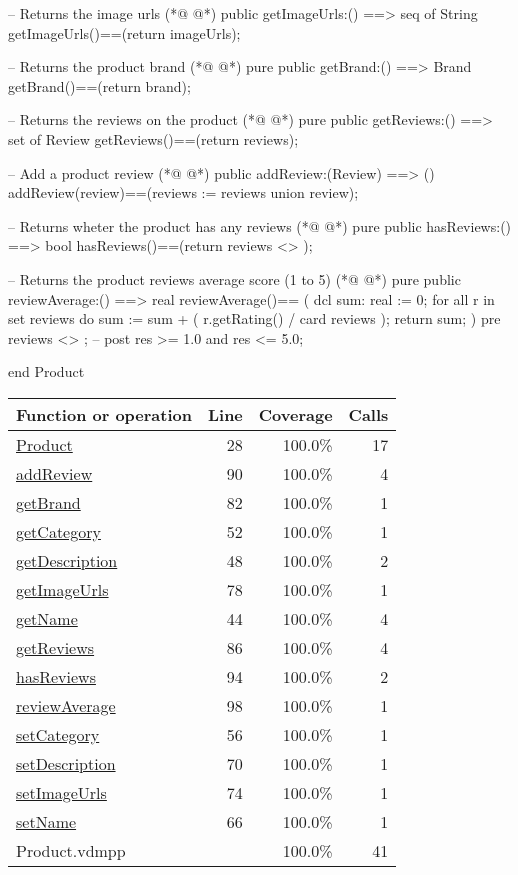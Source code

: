\begin{vdmpp}[breaklines=true]
  -- Returns the image urls
(*@
\label{getImageUrls:78}
@*)
  public getImageUrls:() ==> seq of String
  getImageUrls()==(return imageUrls);
  
  -- Returns the product brand
(*@
\label{getBrand:82}
@*)
  pure public getBrand:() ==> Brand
  getBrand()==(return brand);
  
  -- Returns the reviews on the product
(*@
\label{getReviews:86}
@*)
  pure public getReviews:() ==> set of Review
  getReviews()==(return reviews);
  
  -- Add a product review
(*@
\label{addReview:90}
@*)
  public addReview:(Review) ==> ()
  addReview(review)==(reviews := reviews union {review});
  
  -- Returns wheter the product has any reviews
(*@
\label{hasReviews:94}
@*)
  pure public hasReviews:() ==> bool
  hasReviews()==(return reviews <> {});
  
  -- Returns the product reviews average score (1 to 5)
(*@
\label{reviewAverage:98}
@*)
  pure public reviewAverage:() ==> real
  reviewAverage()==
  (
   dcl sum: real := 0;
   for all r in set reviews do
    sum := sum + ( r.getRating() / card reviews );
   return sum;
  ) pre reviews <> {};
--   post res >= 1.0 and res <= 5.0;
  
end Product
\end{vdmpp}
\bigskip
\begin{longtable}{|l|r|r|r|}
\hline
Function or operation & Line & Coverage & Calls \\
\hline
\hline
\hyperref[Product:28]{Product} & 28&100.0\% & 17 \\
\hline
\hyperref[addReview:90]{addReview} & 90&100.0\% & 4 \\
\hline
\hyperref[getBrand:82]{getBrand} & 82&100.0\% & 1 \\
\hline
\hyperref[getCategory:52]{getCategory} & 52&100.0\% & 1 \\
\hline
\hyperref[getDescription:48]{getDescription} & 48&100.0\% & 2 \\
\hline
\hyperref[getImageUrls:78]{getImageUrls} & 78&100.0\% & 1 \\
\hline
\hyperref[getName:44]{getName} & 44&100.0\% & 4 \\
\hline
\hyperref[getReviews:86]{getReviews} & 86&100.0\% & 4 \\
\hline
\hyperref[hasReviews:94]{hasReviews} & 94&100.0\% & 2 \\
\hline
\hyperref[reviewAverage:98]{reviewAverage} & 98&100.0\% & 1 \\
\hline
\hyperref[setCategory:56]{setCategory} & 56&100.0\% & 1 \\
\hline
\hyperref[setDescription:70]{setDescription} & 70&100.0\% & 1 \\
\hline
\hyperref[setImageUrls:74]{setImageUrls} & 74&100.0\% & 1 \\
\hline
\hyperref[setName:66]{setName} & 66&100.0\% & 1 \\
\hline
\hline
Product.vdmpp & & 100.0\% & 41 \\
\hline
\end{longtable}

